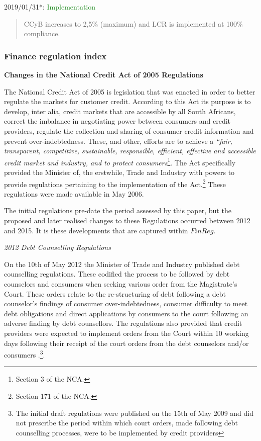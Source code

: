 \documentclass[
  letterpaper,
  DIV=11,
  numbers=noendperiod]{scrartcl}
\begin{document}
2019/01/31*: \textcolor{ForestGreen}{Implementation}

\begin{quote}
CCyB increases to 2,5\% (maximum) and LCR is implemented at 100\% compliance.
\end{quote}

\newpage

\subsubsection{Finance regulation index}\label{finance-regulation-index}

\textbf{Changes in the National Credit Act of 2005 Regulations}

The National Credit Act of 2005 is legislation that was enacted in order
to better regulate the markets for customer credit. According to this
Act its purpose is to develop, inter alia, credit markets that are
accessible by all South Africans, correct the imbalance in negotiating
power between consumers and credit providers, regulate the collection
and sharing of consumer credit information and prevent
over-indebtedness. These, and other, efforts are to achieve a
\emph{``fair, transparent, competitive, sustainable, responsible,
efficient, effective and accessible credit market and industry, and to
protect consumers}\footnote{Section 3 of the NCA.}. The Act specifically
provided the Minister of, the erstwhile, Trade and Industry with powers
to provide regulations pertaining to the implementation of the
Act.\footnote{Section 171 of the NCA.} These regulations were made
available in May 2006.

The initial regulations pre-date the period assessed by this paper, but
the proposed and later realised changes to these Regulations occurred
between 2012 and 2015. It is these developments that are captured within
\(FinReg\).

\emph{2012 Debt Counselling Regulations}

On the 10th of May 2012 the Minister of Trade and Industry published
debt counselling regulations. These codified the process to be followed
by debt counselors and consumers when seeking various order from the
Magistrate's Court. These orders relate to the re-structuring of debt
following a debt counselor's findings of consumer over-indebtedness,
consumer difficulty to meet debt obligations and direct applications by
consumers to the court following an adverse finding by debt counsellors.
The regulations also provided that credit providers were expected to
implement orders from the Court within 10 working days following their
receipt of the court orders from the debt counselors and/or consumers
\citep{regulations2012}.\footnote{The initial draft regulations were
  published on the 15th of May 2009 and did not prescribe the period
  within which court orders, made following debt counselling processes,
  were to be implemented by credit providers}.
\end{document}
